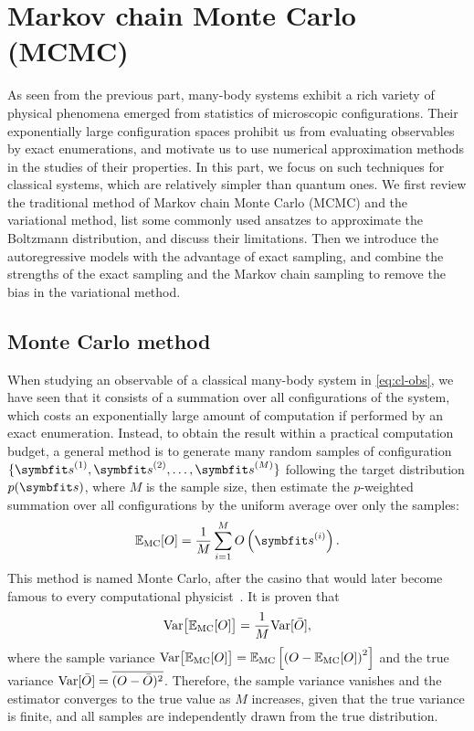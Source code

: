 \chapter{Markov chain Monte Carlo (MCMC)}
\label{ch:mcmc}

As seen from the previous part, many-body systems exhibit a rich variety of physical phenomena emerged from statistics of microscopic configurations. Their exponentially large configuration spaces prohibit us from evaluating observables by exact enumerations, and motivate us to use numerical approximation methods in the studies of their properties. In this part, we focus on such techniques for classical systems, which are relatively simpler than quantum ones. We first review the traditional method of Markov chain Monte Carlo (MCMC) and the variational method, list some commonly used ansatzes to approximate the Boltzmann distribution, and discuss their limitations. Then we introduce the autoregressive models with the advantage of exact sampling, and combine the strengths of the exact sampling and the Markov chain sampling to remove the bias in the variational method.

\section{Monte Carlo method}
\label{sec:monte-carlo}

When studying an observable of a classical many-body system in \cref{eq:cl-obs}, we have seen that it consists of a summation over all configurations of the system, which costs an exponentially large amount of computation if performed by an exact enumeration. Instead, to obtain the result within a practical computation budget, a general method is to generate many random samples of configuration $\{\vs^{(1)}, \vs^{(2)}, \ldots, \vs^{(M)}\}$ following the target distribution $p(\vs)$, where $M$ is the sample size, then estimate the $p$-weighted summation over all configurations by the uniform average over only the samples:
\begin{equation}
\bbE_\text{MC}[O] = \frac{1}{M} \sum_{i = 1}^M O\left( \vs^{(i)} \right).
\label{eq:monte-carlo}
\end{equation}
This method is named Monte Carlo, after the casino that would later become famous to every computational physicist~\cite{metropolis1949monte, landau2021guide1}. It is proven that~\cite{feller1968extention}
\begin{equation}
\mathrm{Var}\big[ \mathbb{E}_\text{MC}[O] \big] = \frac{1}{M} \mathrm{Var}[\bar{O}],
\label{eq:monte-carlo-var}
\end{equation}
where the sample variance $\mathrm{Var}\big[ \mathbb{E}_\text{MC}[O] \big] = \mathbb{E}_\text{MC}\left[ \left( O - \mathbb{E}_\text{MC}[O] \right)^2 \right]$ and the true variance $\mathrm{Var}[\bar{O}] = \overline{(O - \bar{O})^2}$. Therefore, the sample variance vanishes and the estimator converges to the true value as $M$ increases, given that the true variance is finite, and all samples are independently drawn from the true distribution.

